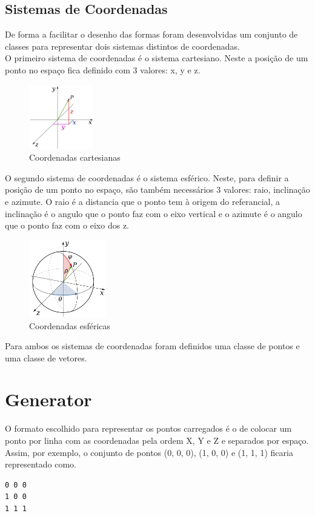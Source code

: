 \documentclass[a4paper]{report}
\begin{document}
\section{Sistemas de Coordenadas}
De forma a facilitar o desenho das formas foram desenvolvidas um conjunto de
classes para representar dois sistemas distintos de coordenadas.\\
O primeiro sistema de coordenadas é o sistema cartesiano. Neste a posição de um
ponto no espaço fica definido com 3 valores: x, y e z.\\
\begin{figure}[H]
    \centering 
    \includegraphics[width=0.25\textwidth]{images/Coord_XYZ.png}  
    \caption{Coordenadas cartesianas}
    \label{fig:coord_xyz}
\end{figure}
O segundo sistema de coordenadas é o sistema esférico. Neste, para definir a
posição de um ponto no espaço, são também necessários 3 valores: raio,
inclinação e azimute. O raio é a distancia que o ponto tem à origem do
referancial, a inclinação é o angulo que o ponto faz com o eixo vertical e o
azimute é o angulo que o ponto faz com o eixo dos z.
\begin{figure}[H]
    \centering 
    \includegraphics[width=0.3\textwidth]{images/Spherical_Coordinates.png}  
    \caption{Coordenadas esféricas}
    \label{fig:spherical_coordinates}
\end{figure}
Para ambos os sistemas de coordenadas foram definidos uma classe de pontos e uma
classe de vetores.

\chapter{Generator}
O formato escolhido para representar os pontos carregados é o de colocar um
ponto por linha com as coordenadas pela ordem X, Y e Z e separados por espaço.\\
Assim, por exemplo, o conjunto de pontos (0, 0, 0), (1, 0, 0) e (1, 1, 1)
ficaria representado como.
\begin{lstlisting}
0 0 0
1 0 0
1 1 1
\end{lstlisting}
\end{document}
